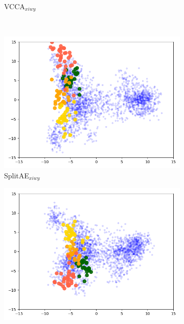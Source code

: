 \begin{figure}[t]
\begin{subfigure}[b]{0.45\textwidth}
         \caption{VCCA$_{xiwy}$}
         \label{fig:vcca_xiwy_comparison}
     \end{subfigure} \\
     \begin{subfigure}[b]{0.45\textwidth}
         \centering
         \includegraphics[width=\textwidth]{PaperB/figures_and_tables/latent_space_visualizations/splitae_vcca_comparison/pca_latent_peppers_splitae_xiwy_seed2.png}
         \caption{SplitAE$_{xiwy}$}
         \label{fig:splitae_xiwy_bell_peppers_comparison}
     \end{subfigure}
     \begin{subfigure}[b]{0.45\textwidth}
         \centering
         \includegraphics[width=\textwidth]{PaperB/figures_and_tables/latent_space_visualizations/splitae_vcca_comparison/pca_latent_peppers_vcca_xiwy_seed2.png}

\end{subfigure}
\end{figure}
